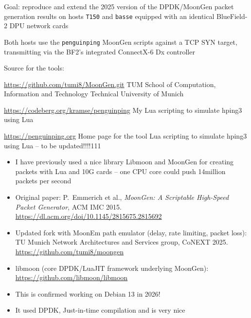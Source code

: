 \documentclass[Screen16to9,17pt]{foils}
\begin{document}


Goal: reproduce and extend the 2025 version of the DPDK/MoonGen packet generation results on hosts \verb+T150+ and \verb+basse+ equipped with an identical BlueField-2 DPU network cards

Both hosts use the \verb+penguinping+ MoonGen scripts against a TCP SYN target, transmitting via the BF2's integrated ConnectX-6 Dx controller

Source for the tools:
\begin{list2}
\item \url{https://github.com/tumi8/MoonGen.git} TUM School of Computation, Information and Technology
Technical University of Munich
\item \url{https://codeberg.org/kramse/penguinping} My Lua scripting to simulate hping3 using Lua
\item \url{https://penguinping.org} Home page for the tool Lua scripting to simulate hping3 using Lua -- to be updated!!!!111
\end{list2}





\begin{itemize}
\item I have previously used a nice library Libmoon and MoonGen for creating packets with Lua and 10G cards -- one CPU core could push 14million packets per second
\item Original paper: P.~Emmerich et al., \emph{MoonGen: A Scriptable High-Speed Packet Generator}, ACM IMC 2015. \url{https://dl.acm.org/doi/10.1145/2815675.2815692}
\item Updated fork with MoonEm path emulator (delay, rate limiting, packet loss): TU Munich Network Architectures and Services group, CoNEXT 2025. \url{https://github.com/tumi8/moongen}
\item libmoon (core DPDK/LuaJIT framework underlying MoonGen): \url{https://github.com/libmoon/libmoon}
\item This is confirmed working on Debian 13 in 2026!
\item It used DPDK, Just-in-time compilation and is very nice
\end{itemize}
\end{document}
